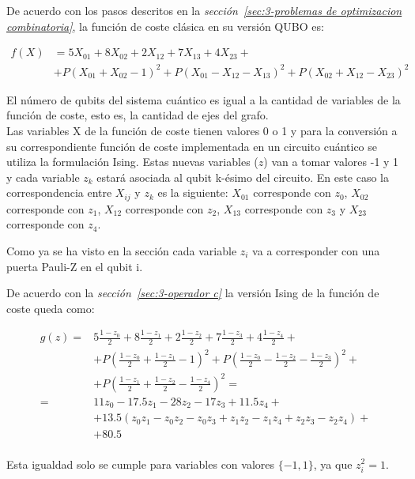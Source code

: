 De acuerdo con los pasos descritos en la \textit{sección~\ref{sec:3-problemas de optimizacion combinatoria}}, la función de coste clásica en su versión QUBO es:

\begin{align*}
  f(X) &= 5X_{01} + 8X_{02} + 2X_{12} + 7X_{13} + 4X_{23} + \\
       &+ P{(X_{01} + X_{02} - 1)}^2 + P{(X_{01} - X_{12} - X_{13})}^2 + P{(X_{02} + X_{12} - X_{23})}^2
\end{align*}

El número de qubits del sistema cuántico es igual a la cantidad de variables de la función de coste, esto es, la cantidad de ejes del grafo. \\
Las variables X de la función de coste tienen valores 0 o 1 y para la conversión a su correspondiente función de coste implementada en un circuito cuántico se utiliza la formulación Ising.  %
Estas nuevas variables ($z$) van a tomar valores -1 y 1 y cada variable $z_k$ estará asociada al qubit k-ésimo del circuito. En este caso la correspondencia entre $X_{ij}$ y $z_k$ es la siguiente:
$X_{01}$ corresponde con $z_0$,
$X_{02}$ corresponde con $z_1$,
$X_{12}$ corresponde con $z_2$,
$X_{13}$ corresponde con $z_3$ y
$X_{23}$ corresponde con $z_4$.

Como ya se ha visto en la sección  %
cada variable $z_i$ va a corresponder con una puerta Pauli-Z en el qubit i.

De acuerdo con la \textit{sección~\ref{sec:3-operador c}} la versión Ising de la función de coste queda como:

\begin{align*}
  g(z) = &5\frac{1-z_0}{2} + 8\frac{1-z_1}{2} + 2\frac{1-z_2}{2} + 7\frac{1-z_3}{2} + 4\frac{1-z_4}{2} + \\
         &+ P{(\frac{1-z_0}{2} + \frac{1-z_1}{2} - 1)}^2 + P{(\frac{1-z_0}{2} - \frac{1-z_2}{2} - \frac{1-z_3}{2})}^2 + \\
         &+ P{(\frac{1-z_1}{2} + \frac{1-z_2}{2} - \frac{1-z_4}{2})}^2 = \\
  = & 11z_0 - 17.5z_1 - 28z_2 - 17z_3 + 11.5z_4 + \\
         &+ 13.5(z_0z_1 - z_0z_2 - z_0z_3 + z_1z_2 - z_1z_4 + z_2z_3 - z_2z_4) + \\
         &+ 80.5 \\
\end{align*}
\par
Esta igualdad solo se cumple para variables con valores \(\{-1, 1\}\), ya que \(z_i^2 = 1\). \\

